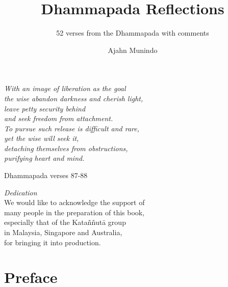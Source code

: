 \documentclass{aruno-gist}
\title{Dhammapada Reflections}
\subtitle{52 verses from the Dhammapada with comments}
\author{Ajahn Munindo}
\date{}
\begin{document}
\thispagestyle{empty}
\mbox{}
\pagecolor[gray]{0.7}
\newpage
\thispagestyle{empty}
\pagecolor{white}
\mbox{}
\newpage


\frontmatter*
\pagestyle{empty}

\midsloppy

\cleartorecto
\begin{quotepage}{60mm}
\centering
\itshape
With an image of liberation as the goal\\
the wise abandon darkness and cherish light,\\
leave petty security behind \\
and seek freedom from attachment.\\
To pursue such release is difficult and rare, \\
yet the wise will seek it, \\
detaching themselves from obstructions,\\
purifying heart and mind.

{\smaller Dhammapada verses 87-88}
\end{quotepage}

\cleartoverso
\begin{quotepage}{80mm}
\centering
\textit{Dedication}\\[0.4\baselineskip]
We would like to acknowledge the support of\\
many people in the preparation of this book,\\
especially that of the Kataññutā group\\
in Malaysia, Singapore and Australia,\\
for bringing it into production.

\end{quotepage}

\cleartorecto
\thispagestyle{empty}


\cleartoverso
\thispagestyle{empty}



\chapter{Preface}



\mainmatter*

\cleartorecto
\thispagestyle{empty}
{\centering

\vspace*{0.6\textheight}
{\chapNameFont\LARGE\color{chaptitle}}

}
\end{document}
